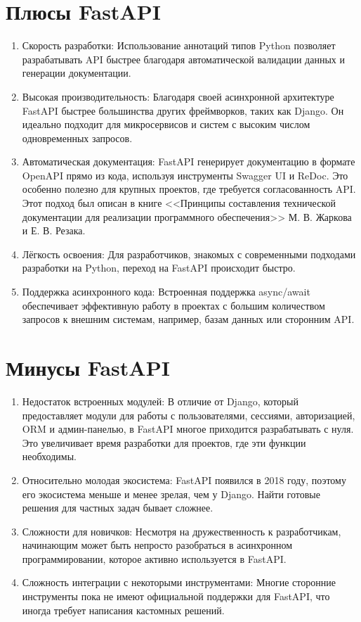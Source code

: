 \section{Плюсы FastAPI}
\begin{enumerate}
    \item Скорость разработки: Использование аннотаций типов Python позволяет разрабатывать API быстрее благодаря автоматической валидации данных и генерации документации.
    \item Высокая производительность: Благодаря своей асинхронной архитектуре FastAPI быстрее большинства других фреймворков, таких как Django. Он идеально подходит для микросервисов и систем с высоким числом одновременных запросов.
    \item Автоматическая документация: FastAPI генерирует документацию в формате OpenAPI прямо из кода, используя инструменты Swagger UI и ReDoc. Это особенно полезно для крупных проектов, где требуется согласованность API. Этот подход был описан в книге <<Принципы составления технической документации для реализации программного обеспечения>> М. В. Жаркова и Е. В. Резака\cite{жарков2023принципы}. 
    \item Лёгкость освоения: Для разработчиков, знакомых с современными подходами разработки на Python, переход на FastAPI происходит быстро.
    \item Поддержка асинхронного кода: Встроенная поддержка async/await обеспечивает эффективную работу в проектах с большим количеством запросов к внешним системам, например, базам данных или сторонним API.
\end{enumerate}

\section{Минусы FastAPI}
\begin{enumerate}
    \item Недостаток встроенных модулей: В отличие от Django, который предоставляет модули для работы с пользователями, сессиями, авторизацией, ORM и админ-панелью, в FastAPI многое приходится разрабатывать с нуля. Это увеличивает время разработки для проектов, где эти функции необходимы.
    \item Относительно молодая экосистема: FastAPI появился в 2018 году, поэтому его экосистема меньше и менее зрелая, чем у Django. Найти готовые решения для частных задач бывает сложнее.
    \item Сложности для новичков: Несмотря на дружественность к разработчикам, начинающим может быть непросто разобраться в асинхронном программировании, которое активно используется в FastAPI.
    \item Сложность интеграции с некоторыми инструментами: Многие сторонние инструменты пока не имеют официальной поддержки для FastAPI, что иногда требует написания кастомных решений.
\end{enumerate}

